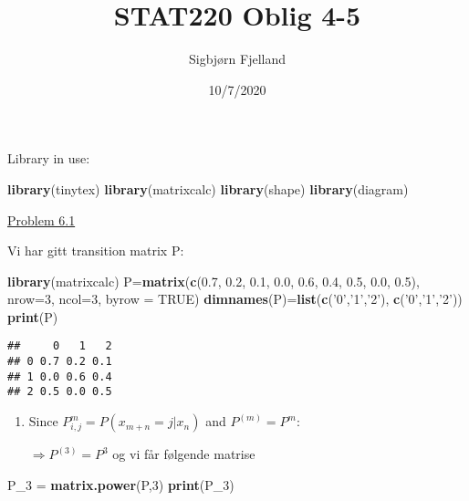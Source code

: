 \documentclass[]{article}
\title{STAT220 Oblig 4-5}
\author{Sigbjørn Fjelland}
\date{10/7/2020}
\newenvironment{Shaded}{\begin{snugshade}}{\end{snugshade}}
\newcommand{\DataTypeTok}[1]{\textcolor[rgb]{0.13,0.29,0.53}{#1}}
\newcommand{\DecValTok}[1]{\textcolor[rgb]{0.00,0.00,0.81}{#1}}
\newcommand{\FloatTok}[1]{\textcolor[rgb]{0.00,0.00,0.81}{#1}}
\newcommand{\KeywordTok}[1]{\textcolor[rgb]{0.13,0.29,0.53}{\textbf{#1}}}
\newcommand{\NormalTok}[1]{#1}
\newcommand{\OtherTok}[1]{\textcolor[rgb]{0.56,0.35,0.01}{#1}}
\newcommand{\StringTok}[1]{\textcolor[rgb]{0.31,0.60,0.02}{#1}}
\begin{document}
\maketitle

Library in use:

\begin{Shaded}
\begin{Highlighting}[]
\KeywordTok{library}\NormalTok{(tinytex)}
\KeywordTok{library}\NormalTok{(matrixcalc)}
\KeywordTok{library}\NormalTok{(shape)}
\KeywordTok{library}\NormalTok{(diagram)}
\end{Highlighting}
\end{Shaded}

\underline{Problem 6.1}

Vi har gitt transition matrix P:

\begin{Shaded}
\begin{Highlighting}[]
\KeywordTok{library}\NormalTok{(matrixcalc)}
\NormalTok{P=}\KeywordTok{matrix}\NormalTok{(}\KeywordTok{c}\NormalTok{(}\FloatTok{0.7}\NormalTok{, }\FloatTok{0.2}\NormalTok{, }\FloatTok{0.1}\NormalTok{, }\FloatTok{0.0}\NormalTok{, }\FloatTok{0.6}\NormalTok{, }\FloatTok{0.4}\NormalTok{, }\FloatTok{0.5}\NormalTok{, }\FloatTok{0.0}\NormalTok{, }\FloatTok{0.5}\NormalTok{), }\DataTypeTok{nrow=}\DecValTok{3}\NormalTok{, }\DataTypeTok{ncol=}\DecValTok{3}\NormalTok{, }\DataTypeTok{byrow =} \OtherTok{TRUE}\NormalTok{)}
\KeywordTok{dimnames}\NormalTok{(P)=}\KeywordTok{list}\NormalTok{(}\KeywordTok{c}\NormalTok{(}\StringTok{'0'}\NormalTok{,}\StringTok{'1'}\NormalTok{,}\StringTok{'2'}\NormalTok{), }\KeywordTok{c}\NormalTok{(}\StringTok{'0'}\NormalTok{,}\StringTok{'1'}\NormalTok{,}\StringTok{'2'}\NormalTok{))}
\KeywordTok{print}\NormalTok{(P)}
\end{Highlighting}
\end{Shaded}

\begin{verbatim}
##     0   1   2
## 0 0.7 0.2 0.1
## 1 0.0 0.6 0.4
## 2 0.5 0.0 0.5
\end{verbatim}

\begin{enumerate}
\def\labelenumi{\alph{enumi})}
\item
  Since \(P_{i,j}^{m} = P(x_{m+n}=j|x_{n})\) and \(P^{(m)}=P^{m}\):

  \(\Rightarrow{P^{(3)}=P^{3}}\) og vi får følgende matrise
\end{enumerate}

\begin{Shaded}
\begin{Highlighting}[]
\NormalTok{P_}\DecValTok{3}\NormalTok{ =}\StringTok{ }\KeywordTok{matrix.power}\NormalTok{(P,}\DecValTok{3}\NormalTok{)}
\KeywordTok{print}\NormalTok{(P_}\DecValTok{3}\NormalTok{)}
\end{Highlighting}
\end{Shaded}
\end{document}
